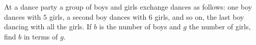 At a dance party a group of boys and girls exchange dances as follows: one boy dances with $5$ girls, a second boy dances with $6$ girls, and so on, the last boy dancing with all the girls. If $b$ is the number of boys and $g$ the number of girls, find $b$ in terms of $g$.
